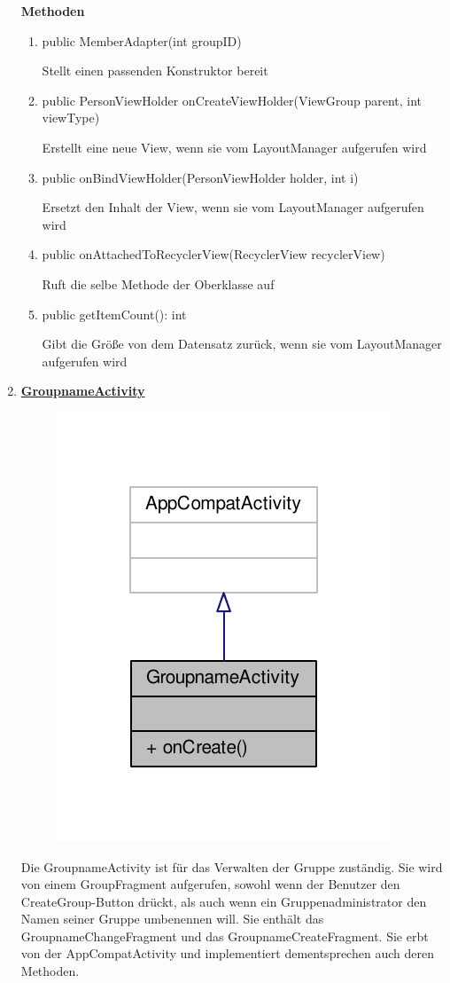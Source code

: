 \begin{enumerate}
	\textbf{Methoden}
	\begin{enumerate}
		\item public MemberAdapter(int groupID)
		
		Stellt einen passenden Konstruktor bereit
		
		\item public PersonViewHolder onCreateViewHolder(ViewGroup parent, int viewType)
	
		Erstellt eine neue View, wenn sie vom LayoutManager aufgerufen wird
		
		\item public onBindViewHolder(PersonViewHolder holder, int i)

		Ersetzt den Inhalt der View, wenn sie vom LayoutManager aufgerufen wird
		
		\item public onAttachedToRecyclerView(RecyclerView recyclerView)
		
		Ruft die selbe Methode der Oberklasse auf
		
		\item public getItemCount(): int

		Gibt die Größe von dem Datensatz zurück, wenn sie vom LayoutManager aufgerufen wird
	\end{enumerate}


	\item \textbf{\underline{GroupnameActivity}}
	
	\begin{figure}[H]
		\includegraphics[scale = 1]{res/groupname_activity__inherit__graph.pdf}
		\centering
	\end{figure}
	Die GroupnameActivity ist für das Verwalten der Gruppe zuständig. Sie wird von einem GroupFragment aufgerufen, sowohl wenn der Benutzer den CreateGroup-Button drückt, als auch wenn ein Gruppenadministrator den Namen seiner Gruppe umbenennen will. Sie enthält das GroupnameChangeFragment und das GroupnameCreateFragment. Sie erbt von der AppCompatActivity und implementiert dementsprechen auch deren Methoden.
	

\end{enumerate}
